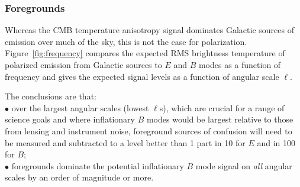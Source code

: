 \vspace{-0.18in}

\subsubsection{Foregrounds}
\label{sec:foregrounds}

\vspace{-0.05in}


Whereas the CMB temperature anisotropy signal dominates Galactic sources
of emission over much of the sky, this is not the case for polarization. 
Figure~\ref{fig:frequency} compares the expected RMS brightness temperature 
of polarized emission from Galactic sources to $E$ and $B$ modes
as a function of frequency and gives the expected signal levels as a function of angular scale $\ell$.  

\noindent The conclusions are that: \\
$\bullet$ \hspace{0.05in} over the largest angular scales (lowest $\ell$s), which are crucial for a range 
of science goals and where inflationary $B$ modes 
would be largest relative to those from lensing and instrument noise, foreground sources of confusion will need to be measured and subtracted to a level better than 1 part in 10 for $E$ and in 100 for $B$; \\
$\bullet$ \hspace{0.05in} foregrounds dominate the potential inflationary $B$ mode signal on {\it all} angular 
scales by an order of magnitude or more.

